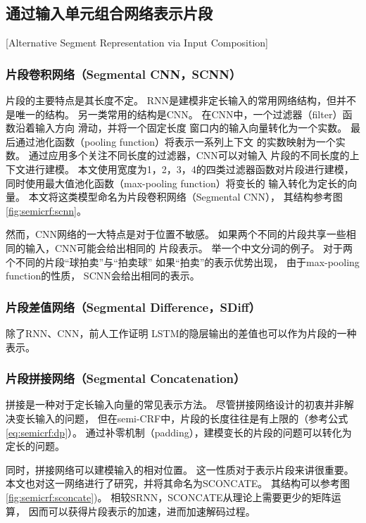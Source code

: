 \subsection{通过输入单元组合网络表示片段}[Alternative Segment Representation via Input Composition]\label{sec:semicrf:alt-inp-rep}

\subsubsection{片段卷积网络（Segmental CNN，SCNN）}
片段的主要特点是其长度不定。
RNN是建模非定长输入的常用网络结构，但并不是唯一的结构。
另一类常用的结构是CNN\cite{Collobert:2011:NLP:1953048.2078186}。
在CNN中，一个过滤器（filter）函数沿着输入方向
滑动，并将一个固定长度
窗口内的输入向量转化为一个实数。
最后通过池化函数（pooling function）将表示一系列上下文
的实数映射为一个实数。
通过应用多个关注不同长度的过滤器，CNN可以对输入
片段的不同长度的上下文进行建模。
本文使用宽度为1，2，3，4的四类过滤器函数对片段进行建模，
同时使用最大值池化函数（max-pooling function）将变长的
输入转化为定长的向量。
本文将这类模型命名为片段卷积网络（Segmental CNN），
其结构参考图\ref{fig:semicrf:scnn}。

然而，CNN网络的一大特点是对于位置不敏感。
如果两个不同的片段共享一些相同的输入，CNN可能会给出相同的
片段表示。
举一个中文分词的例子。
对于两个不同的片段``球拍卖''与``拍卖球''
如果``拍卖''的表示优势出现，
由于max-pooling function的性质，
SCNN会给出相同的表示。 

\subsubsection{片段差值网络（Segmental Difference，SDiff）}

除了RNN、CNN，前人工作证明
LSTM的隐层输出的差值也可以作为片段的一种表示。

\subsubsection{片段拼接网络（Segmental Concatenation）}
拼接是一种对于定长输入向量的常见表示方法。
尽管拼接网络设计的初衷并非解决变长输入的问题，
但在semi-CRF中，片段的长度往往是有上限的（参考公式\ref{eq:semicrf:dp}）。
通过补零机制（padding），建模变长的片段的问题可以转化为定长的问题。

同时，拼接网络可以建模输入的相对位置。
这一性质对于表示片段来讲很重要。
本文也对这一网络进行了研究，并将其命名为SCONCATE。
其结构可以参考图\ref{fig:semicrf:sconcate})。
相较SRNN，SCONCATE从理论上需要更少的矩阵运算，
因而可以获得片段表示的加速，进而加速解码过程。

